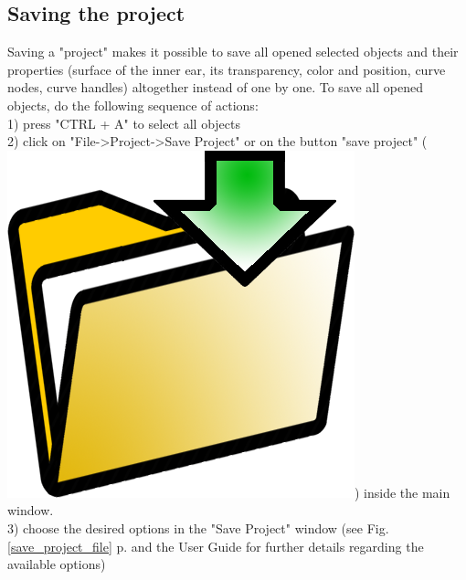 \documentclass[12pt, a4paper]{book}
\begin{document}
\subsection{Saving the project}
Saving a "project" makes it possible to save all opened selected objects and their properties (surface of the inner ear, its transparency, color and position, curve nodes, curve handles) altogether instead of one by one. 
To save all opened objects, do the following sequence of actions:\\
1) press "CTRL + A" to select all objects\\
2) click on "File->Project->Save Project" or on the button "save project" (\includegraphics[scale=0.03]{../images/03/save_data.png})  inside the main window.\\
3) choose the desired options in the "Save Project" window (see Fig. \ref{save_project_file} p.\pageref{save_project_file} and the User Guide for further details regarding the available options)
\end{document}
